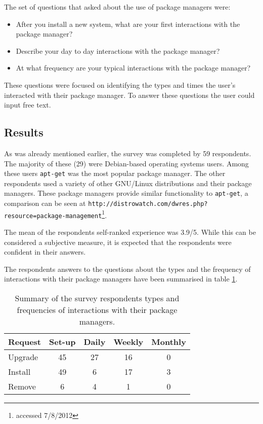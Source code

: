 The set of questions that asked about the use of package managers were:
\begin{itemize}
  \item After you install a new system, what are your first interactions with the package manager?
  \item Describe your day to day interactions with the package manager?
  \item At what frequency are your typical interactions with the package manager?
\end{itemize}
These questions were focused on identifying the types and times the user's interacted with their package manager.
To answer these questions the user could input free text.

\subsection{Results}
As was already mentioned earlier, the survey was completed by 59 respondents.
The majority of these (29) were Debian-based operating systems users.
Among these users \texttt{apt-get} was the most popular package manager.
The other respondents used a variety of other GNU/Linux distributions and their package managers.
These package managers provide similar functionality to \texttt{apt-get}, a comparison can be seen at \texttt{http://distrowatch.com/dwres.php?resource=package-management}\footnote{accessed 7/8/2012}. 

The mean of the respondents self-ranked experience was 3.9/5.
While this can be considered a subjective measure, it is expected that the respondents were confident in their answers. 

The respondents answers to the questions about the types and the frequency of interactions with their package managers have been summarised in table \ref{strat.tblaction}.
\begin{table}[htp]
\centering
\begin{tabular}{| l | c | c | c | c |} \hline
\textbf{Request} & \textbf{Set-up} & \textbf{Daily} & \textbf{Weekly} & \textbf{Monthly} \\ \hline
Upgrade  & 45 & 27 & 16 & 0 \\
Install & 49 & 6 & 17 & 3 \\
Remove & 6 & 4 & 1 & 0\\ \hline
\end{tabular}
\caption{Summary of the survey respondents types and frequencies of interactions with their package managers.}
\label{strat.tblaction}
\end{table}

